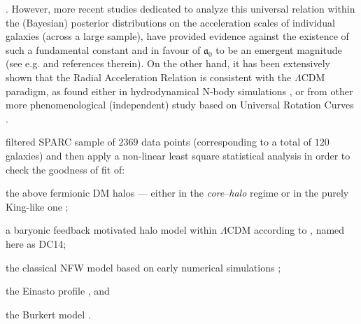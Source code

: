 . However, more recent studies dedicated to analyze this universal relation within the (Bayesian) posterior distributions on the acceleration scales of individual galaxies (across a large sample), have provided evidence against the existence of such a fundamental constant and in favour of $\mathfrak{a}_0$ to be an emergent magnitude (see e.g. \citealp{2020MNRAS.494.2875M} and references therein). On the other hand, it has been extensively shown that the Radial Acceleration Relation is consistent with the $\Lambda$CDM paradigm, as found either in hydrodynamical N-body simulations  \citep{2016MNRAS.456L.127D,2017MNRAS.471.1841N,2017PhRvL.118p1103L,2019MNRAS.485.1886D}, or from other more phenomenological (independent) study based on Universal Rotation Curves \citep{2018FoPh...48.1517S}.

 filtered SPARC sample of $2369$ data points (corresponding to a total of $120$ galaxies) and then apply a non-linear least square statistical analysis in order to check the goodness of fit of: 
%
\begin{inparaenum}[(a)]
    \item the above fermionic DM halos --- either in the \textit{core}--\textit{halo} regime \citep{2019PDU....24..278A,2021MNRAS.502.4227A} or in the purely King-like one \citep{2021MNRAS.502.4227A};
    \item a baryonic feedback motivated halo model within $\Lambda$CDM according to \citet{2014MNRAS.441.2986D}, named here as DC14;
    \item the classical NFW model based on early numerical simulations \citep{1997ApJ...490..493N};
    \item the Einasto profile \citep{1989A&A...223...89E,2006AJ....132.2685M}, and
    \item the Burkert model \citep{1995ApJ...447L..25B}.
\end{inparaenum} 

